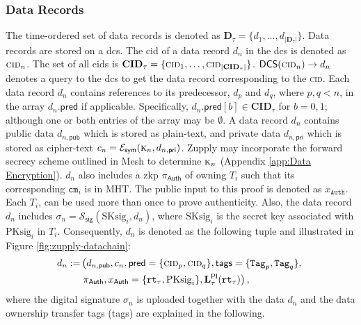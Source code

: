 \subsubsection{Data Records}
The time-ordered set of data records is denoted as $\mathbf{D}_\tau = \{d_1, \dots, d_{|\mathbf{D}_\tau|}\}$. Data records are stored on a \gls{dcs}. 
The \gls{cid} of a data record $d_n$ in the \gls{dcs} is denoted as $\textsc{cid}_n$.
The set of all \gls{cid}s is $\mathbf{CID}_\tau = \{\textsc{cid}_1, \dots, \textsc{cid}_{|\mathbf{CID}_\tau|}\}$. 
$\mathsf{DCS}(\textsc{cid}_n) \rightarrow d_n$ denotes a query to the \gls{dcs} to get the data record corresponding to the  \textsc{cid}.
Each data record $d_n$ contains references to its predecessor, $d_p$ and $d_q$, where $p,q < n$, in the array $d_n.\mathsf{pred}$ if applicable. Specifically, $d_n.\mathsf{pred}[b] \in \mathbf{CID}_\tau$ for ${b = 0, 1}$; although one or both entries of the array may be $\emptyset$.
A data record $d_n$ contains public data $d_{n, \mathsf{pub}}$ which is stored as plain-text, and private data $d_{n, \mathsf{pri}}$ which is stored as cipher-text $c_n = \mathcal{E}_\mathsf{sym}(\textsc{k}_n, d_{n, \mathsf{pri}})$. Zupply may incorporate the forward secrecy scheme outlined in Mesh \cite{altawy2019mesh} to determine $\textsc{k}_n$ (Appendix \ref{app:Data Encryption}). $d_n$ also includes a \gls{zkp} $\pi_\textsf{Auth}$ of owning $T_i$ such that its corresponding $\texttt{cm}_i$ is in \textsf{MHT}.  The public input to this proof is denoted as $x_\texttt{Auth}$. Each $T_i$, can be used more than once to prove authenticity.
Also, the data record $d_n$ includes $\sigma_n = \mathcal{S}_\mathsf{sig}(\text{SKsig}_i, d_n)$, where $\text{SKsig}_i$ is the secret key associated with $\text{PKsig}_{i}$ in $T_i$. Consequently, $d_n$ is denoted as the following tuple and illustrated in Figure \ref{fig:zupply-datachain}:
\begin{align*}
    d_n  := & \left( d_{n, \mathsf{pub}}, c_n, \mathsf{pred}=\{\textsc{cid}_p, \textsc{cid}_q\}, \mathsf{tags}=\{\texttt{Tag}_p, \texttt{Tag}_q\}, \right. \\ 
    & \left. \pi_\textsf{Auth}, x_\textsf{Auth}=\{\texttt{rt}_\tau, \text{PKsig}_{i}\}, \mathbf{L}_\tau^\mathsf{PI}(\texttt{rt}_\tau) \right),
\end{align*}
where the digital signature $\sigma_n$  is uploaded together with the data  $d_n$ and the data ownership transfer tags (\textsf{tags}) are explained in the following.

